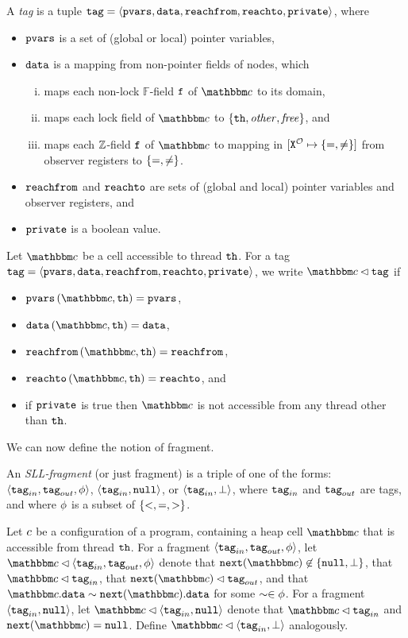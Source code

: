 A {\em tag} is a tuple
$\mathtt{tag} = \left\langle\mathtt{pvars},\mathtt{data},\mathtt{reachfrom},\mathtt{reachto},\mathtt{private}\right\rangle$, where
\begin{itemize}
\item
  $\mathtt{pvars}$ is a set of (global or local) pointer variables,
\item
  $\mathtt{data}$ is a mapping from non-pointer fields of nodes, which
  \begin{enumerate}[(i)]
  \item
  maps each non-lock $\mathbb{F}$-field $\mathtt{f}$ of $\cell$ to its domain, 
  \item
    maps each  lock field of $\cell$
    to $\left\{{\tt th},\mathit{other},\mathit{free}\right\}$,
  and
\item
  maps each ${\mathbb Z}$-field $\mathtt{f}$ of $\cell$ to mapping in
  $[{\tt X}^{{\mathcal O}} \mapsto{\left\{=,\neq\right\}}]$ from observer registers to
  $\left\{=,\neq\right\}$.
  \end{enumerate}
 \item
   $\mathtt{reachfrom}$ and $\mathtt{reachto}$ are sets of (global and local) pointer variables and observer registers, and
  \item $\mathtt{private}$ is a boolean value.
\end{itemize}
Let $\cell$ be a cell accessible to thread ${\tt th}$. For a tag
$\mathtt{tag} = \left\langle\mathtt{pvars},\mathtt{data},\mathtt{reachfrom},\mathtt{reachto},\mathtt{private}\right\rangle$, we write $\cell \lhd \atag$ if
\begin{itemize}
\item
  $\pvarsofth{\cell}{\thread} = \pvars$,
\item
  $\valsofth{\cell}{\thread} = \vals$,
\item
  $\reachfromofth{\cell}{\thread} = \reachfrom$,
\item
  $\reachtoofth{\cell}{\thread} = \reachto$,
  and
\item
  if $\mathtt{private}$ is true then $\cell$ is not accessible from any thread other
  than ${\tt th}$.
\end{itemize}
We can now define the notion of fragment.

\begin{definition}
\label{def:sll-fragment}
An {\em SLL-fragment} (or just fragment)
is a triple of one of the forms:
$\left\langle\mathtt{tag}_{in},\mathtt{tag}_{out},\phi\right\rangle$,
$\left\langle\mathtt{tag}_{in},{\tt null}\right\rangle$, or
$\left\langle\mathtt{tag}_{in},\bot\right\rangle$,
where $\mathtt{tag}_{in}$ and $\mathtt{tag}_{out}$ are tags,
    and where $\phi$ is a subset of $\left\{<, =, >\right\}$.
\end{definition}

Let $c$ be a configuration of a program, containing a heap cell $\cell$
that is accessible from thread ${\tt th}$. For a fragment $\left\langle\mathtt{tag}_{in},\mathtt{tag}_{out},\phi\right\rangle$,
let $\cell \lhd \sllviewtuple$ denote that
$\mathtt{next}(\cell) \not\in \set{\nullconst,\dangconst}$, that
$\cell \lhd \inputtag$, that $\mathtt{next}(\cell) \lhd \outputtag$, 
and that
$\cell.\vals \sim \mathtt{next}(\cell).\vals$ for some
$\sim \in \phi$.
For a fragment $\left\langle\mathtt{tag}_{in},{\tt null}\right\rangle$, let
$\cell \lhd \tuple{\inputtag,\nullconst}$ denote that
$\cell \lhd \inputtag$ and $\mathtt{next}(\cell) = \nullconst$.
Define $\cell \lhd \tuple{\inputtag,\dangconst}$ analogously.

